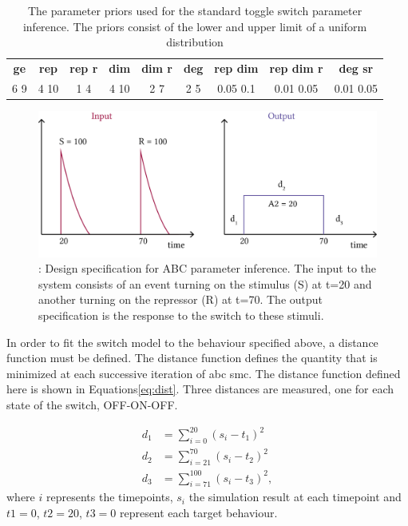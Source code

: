 \begin{table}[htbp]
\centering
\caption{The parameter priors used for the standard toggle switch parameter inference. The priors consist of the lower and upper limit of a uniform distribution}
\label{tab:param_inf_params}
\begin{tabular}{ccccccccc}
\toprule
 \textbf{ge}     & \textbf{rep}     & \textbf{rep r}     & \textbf{dim}    & \textbf{dim r}     & \textbf{deg}  & \textbf{rep dim}    & \textbf{rep dim r} & \textbf{deg sr}    \\
6 9     & 4 10    & 1 4       & 4 10   & 2 7       & 2 5  & 0.05 0.1   & 0.01 0.05     & 0.01 0.05         \\ \bottomrule
\end{tabular}
\end{table}


\begin{figure}[htbp]
	\begin{center}
\includegraphics[scale=0.7]{../../chapters/chapterABCSysBio/images/behaviour.png}
\caption[LoF caption]{\label{fig:abc_behav}: Design specification for ABC parameter inference. The input to the system consists of an event turning on the stimulus (S) at t=20 and another turning on the repressor (R) at t=70. The output specification is the response to the switch to these stimuli.}
\end{center}
\end{figure}
In order to fit the switch model to the behaviour specified above, a distance function must be defined. The distance function defines the quantity that is minimized at each successive iteration of \acrshort{abc} \acrshort{smc}. The distance function defined here is shown in Equations\ref{eq:dist}. Three distances are measured, one for each state of the switch, OFF-ON-OFF.


\begin{align}\label{eq:dist}
	d_1 &= \sum_{i=0}^{20} (s_i-t_1)^2 \\
	d_2 &= \sum_{i=21}^{70} (s_i-t_2)^2 \\
	d_3 &=  \sum_{i=71}^{100} (s_i-t_3)^2,
\end{align}
where $i$ represents the timepoints, $s_i$ the simulation result at  each timepoint and $t1 = 0$, $t2 = 20$, $t3 = 0$ represent each target behaviour.


